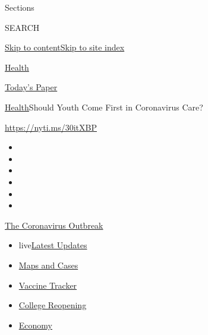 Sections

SEARCH

\protect\hyperlink{site-content}{Skip to
content}\protect\hyperlink{site-index}{Skip to site index}

\href{https://www.nytimes.com/section/health}{Health}

\href{https://myaccount.nytimes.com/auth/login?response_type=cookie\&client_id=vi}{}

\href{https://www.nytimes.com/section/todayspaper}{Today's Paper}

\href{/section/health}{Health}\textbar{}Should Youth Come First in
Coronavirus Care?

\url{https://nyti.ms/30itXBP}

\begin{itemize}
\item
\item
\item
\item
\item
\item
\end{itemize}

\href{https://www.nytimes.com/news-event/coronavirus?action=click\&pgtype=Article\&state=default\&region=TOP_BANNER\&context=storylines_menu}{The
Coronavirus Outbreak}

\begin{itemize}
\tightlist
\item
  live\href{https://www.nytimes.com/2020/08/03/world/coronavirus-covid-19.html?action=click\&pgtype=Article\&state=default\&region=TOP_BANNER\&context=storylines_menu}{Latest
  Updates}
\item
  \href{https://www.nytimes.com/interactive/2020/us/coronavirus-us-cases.html?action=click\&pgtype=Article\&state=default\&region=TOP_BANNER\&context=storylines_menu}{Maps
  and Cases}
\item
  \href{https://www.nytimes.com/interactive/2020/science/coronavirus-vaccine-tracker.html?action=click\&pgtype=Article\&state=default\&region=TOP_BANNER\&context=storylines_menu}{Vaccine
  Tracker}
\item
  \href{https://www.nytimes.com/2020/08/02/us/covid-college-reopening.html?action=click\&pgtype=Article\&state=default\&region=TOP_BANNER\&context=storylines_menu}{College
  Reopening}
\item
  \href{https://www.nytimes.com/live/2020/08/03/business/stock-market-today-coronavirus?action=click\&pgtype=Article\&state=default\&region=TOP_BANNER\&context=storylines_menu}{Economy}
\end{itemize}

